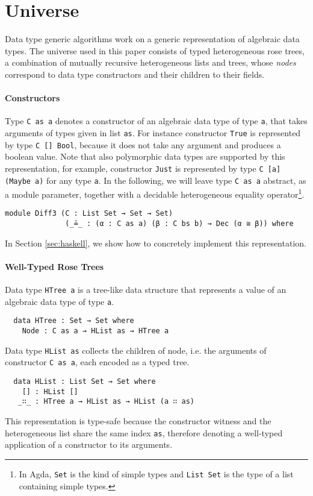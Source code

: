 \documentclass{sigplanconf}
\theoremstyle{plain}
\begin{document}
\section{Universe}
\label{section:universe}
Data type generic algorithms work on a generic representation of
algebraic data types.
%
The universe used in this paper consists of typed heterogeneous rose
trees, a combination of mutually recursive heterogeneous lists and
trees, whose \emph{nodes} correspond to data type constructors and
their children to their fields.

\paragraph{Constructors}
Type \texttt{C as a} denotes a constructor of an algebraic data type
of type \texttt{a}, that takes arguments of types given in list
\texttt{as}.
%
For instance constructor \texttt{True} is represented by type \texttt{C []
  Bool}, because it does not take any argument and produces a boolean
value.
%
Note that also polymorphic data types are supported by this
representation, for example, constructor \texttt{Just} is represented
by type \texttt{C [a] (Maybe a)} for any type \texttt{a}.
%
In the following, we will leave type \texttt{C as a} abstract, as a
module parameter, together with a decidable heterogeneous equality
operator\footnote{In Agda, \texttt{Set} is the kind of simple types
  and \texttt{List Set} is the type of a list containing simple
  types.}.

\begin{verbatim}
module Diff3 (C : List Set → Set → Set) 
              (_≟_ : (α : C as a) (β : C bs b) → Dec (α ≅ β)) where
\end{verbatim}
In Section \ref{sec:haskell}, we show how to concretely implement this
representation.

\paragraph{Well-Typed Rose Trees}
Data type \texttt{HTree a} is a tree-like data structure that
represents a value of an algebraic data type of type \texttt{a}.
\begin{verbatim}
  data HTree : Set → Set where
    Node : C as a → HList as → HTree a
\end{verbatim}
%
Data type \texttt{HList as} collects the children of node, i.e. the
arguments of constructor \texttt{C as a}, each encoded as a typed
tree.
%
\begin{verbatim}
  data HList : List Set → Set where
    [] : HList []
   _∷_ : HTree a → HList as → HList (a ∷ as)
\end{verbatim}
%
This representation is type-safe because the constructor
witness and the heterogeneous list share the same index
\texttt{as}, therefore denoting a well-typed application of a
constructor to its arguments.
% 
\end{document}
